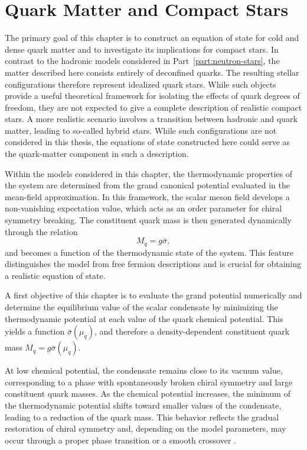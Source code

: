 \chapter{Quark Matter and Compact Stars}
\label{chap:quark_matter_stars}

The primary goal of this chapter is to construct an equation of state
for cold and dense quark matter and to investigate its implications
for compact stars. In contrast to the hadronic models considered in
Part~\ref{part:neutron-stars}, the matter described here consists entirely
of deconfined quarks. The resulting stellar configurations therefore
represent idealized quark stars. While such objects provide a useful
theoretical framework for isolating the effects of quark degrees of
freedom, they are not expected to give a complete description of
realistic compact stars. A more realistic scenario involves a
transition between hadronic and quark matter, leading to so-called 
hybrid stars. While such configurations are not considered in this
thesis, the equations of state constructed here could
serve as the quark-matter component in such a description.

Within the models considered in this chapter, the thermodynamic properties of the system are
determined from the grand canonical potential evaluated in the
mean-field approximation. In this framework, the scalar meson field
develops a non-vanishing expectation value, which acts as an order
parameter for chiral symmetry breaking. The constituent quark mass is
then generated dynamically through the relation
\begin{equation}
M_q = g \bar{\sigma} ,
\end{equation}
and becomes a function of the thermodynamic state of the system. This
feature distinguishes the model from free fermion descriptions and is
crucial for obtaining a realistic equation of state.

A first objective of this chapter is to evaluate the grand potential
numerically and determine the equilibrium value of the scalar
condensate by minimizing the thermodynamic potential at each value of
the quark chemical potential. This yields a function
$\bar{\sigma}(\mu_q)$, and therefore a density-dependent constituent
quark mass $M_q = g\bar{\sigma}(\mu_q)$.

At low chemical potential, the condensate remains close to its vacuum
value, corresponding to a phase with spontaneously broken chiral
symmetry and large constituent quark masses. As the chemical
potential increases, the minimum of the thermodynamic potential shifts
toward smaller values of the condensate, leading to a reduction of the
quark mass. This behavior reflects the gradual restoration of chiral
symmetry and, depending on the model parameters, may occur through a
proper phase transition or a smooth crossover
\cite{Folkestad2018,Buballa2005,Schmitt2010}.

